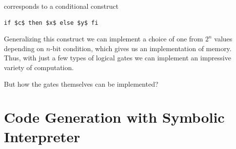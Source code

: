 corresponds to a conditional construct

\begin{lstlisting}[mathescape=true]
    if $c$ then $x$ else $y$ fi
\end{lstlisting}

Generalizing this construct we can implement a choice of one from $2^n$ values depending on $n$-bit condition, which
gives us an implementation of memory. Thus, with just a few types of logical gates we can implement an impressive
variety of computation.

But how the gates themselves can be implemented?










\section{Code Generation with Symbolic Interpreter}

\section{}


